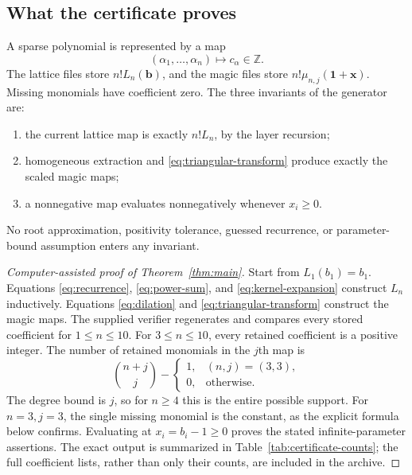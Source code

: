 \documentclass[11pt]{article}
\theoremstyle{definition}
\newcommand{\Z}{\mathbb Z}
\newcommand{\bb}{\mathbf b}
\newcommand{\xx}{\mathbf x}
\newcommand{\one}{\mathbf 1}
\numberwithin{equation}{section}
\begin{document}
\subsection{What the certificate proves}
A sparse polynomial is represented by a map
\[
 (\alpha_1,\ldots,\alpha_n)\longmapsto c_\alpha\in\Z.
\]
The lattice files store $n!L_n(\bb)$, and the magic files store
$n!\mu_{n,j}(\one+\xx)$. Missing monomials have coefficient zero.
The three invariants of the generator are:
\begin{enumerate}[label=(\roman*),itemsep=0.15em]
\item the current lattice map is exactly $n!L_n$, by the layer recursion;
\item homogeneous extraction and \eqref{eq:triangular-transform} produce
exactly the scaled magic maps;
\item a nonnegative map evaluates nonnegatively whenever $x_i\ge0$.
\end{enumerate}
No root approximation, positivity tolerance, guessed recurrence, or
parameter-bound assumption enters any invariant.

\begin{proof}[Computer-assisted proof of Theorem~\ref{thm:main}]
Start from $L_1(b_1)=b_1$. Equations \eqref{eq:recurrence},
\eqref{eq:power-sum}, and \eqref{eq:kernel-expansion} construct $L_n$
inductively. Equations \eqref{eq:dilation} and
\eqref{eq:triangular-transform} construct the magic maps. The supplied
verifier regenerates and compares every stored coefficient for $1\le n\le10$.
For $3\le n\le10$, every retained coefficient is a positive integer.
The number of retained monomials in the $j$th map is
\begin{equation}
 \binom{n+j}{j}-\begin{cases}1,&(n,j)=(3,3),\\0,&\text{otherwise}.
 \end{cases}
 \label{eq:support-size}
\end{equation}
The degree bound is $j$, so for $n\ge4$ this is the entire possible support.
For $n=3,j=3$, the single missing monomial is the constant, as the explicit
formula below confirms. Evaluating at $x_i=b_i-1\ge0$ proves the stated
infinite-parameter assertions. The exact output is summarized in
Table~\ref{tab:certificate-counts}; the full coefficient lists, rather than
only their counts, are included in the archive.
\end{proof}
\end{document}

